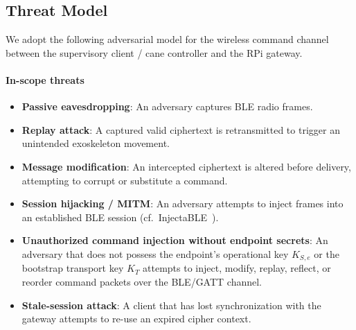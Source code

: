 \documentclass[journal]{IEEEtran}
\begin{document}
\subsection{Threat Model}
\label{sec:threatmodel}

We adopt the following adversarial model for the wireless command channel between the supervisory client / cane controller and the RPi gateway.

\paragraph{In-scope threats}
\begin{itemize}
  \item \textbf{Passive eavesdropping}: An adversary captures BLE radio frames.
  \item \textbf{Replay attack}: A captured valid ciphertext is retransmitted to trigger an unintended exoskeleton movement.
  \item \textbf{Message modification}: An intercepted ciphertext is altered before delivery, attempting to corrupt or substitute a command.
  \item \textbf{Session hijacking / MITM}: An adversary attempts to inject frames into an established BLE session (cf.\ InjectaBLE~\cite{cayre2021injectable}).
  \item \textbf{Unauthorized command injection without endpoint secrets}: An adversary that does not possess the endpoint's operational key \(K_{S,e}\) or the bootstrap transport key \(K_T\) attempts to inject, modify, replay, reflect, or reorder command packets over the BLE/GATT channel.
  \item \textbf{Stale-session attack}: A client that has lost synchronization with the gateway attempts to re-use an expired cipher context.
\end{itemize}
\end{document}
